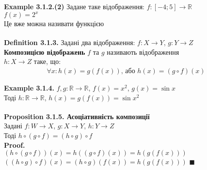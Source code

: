 \documentclass[a4paper, 14pt]{extarticle}
\def\qed{$\blacksquare$}
\begin{document}
	\textbf{Example 3.1.2.(2)} Задане таке відображення: $f: [-4; 5] \to \mathbb{R}$\\
	$f(x) = 2^x$\\
	Це вже можна називати функцією
	\\
	\\
	\textbf{Definition 3.1.3.} Задані два відображення: $f: X \to Y$, $g: Y \to Z$\\
	\textbf{Композицією відображень} $f$ та $g$ називають відображення \\ $h: X \to Z$ таке, що:
	\begin{align*}
	\forall x: h(x) = g(f(x)) \textrm{, або } h(x) = (g \circ f) (x)
	\end{align*}
	\begin{figure}[H]
\end{figure}
	\textbf{Example 3.1.4.} $f,g: \mathbb{R} \to \mathbb{R}$, $f(x) = x^2$, $g(x) = \sin x$\\
	Тоді $h: \mathbb{R} \to \mathbb{R}$, $h(x) = g(f(x)) = \sin x^2$\\
	\\
	\textbf{Proposition 3.1.5. Асоціативність композиції}\\
	Задані $f: W \to X$, $g: X \to Y$, $h: Y \to Z$\\
	Тоді $h \circ (g \circ f) = (h \circ g) \circ f$\\
	\textbf{Proof.}\\
	$(h \circ (g \circ f)) (x) = h((g \circ f) (x)) = h(g(f(x)))$\\
	$((h \circ g) \circ f) (x) = (h \circ g) (f(x)) = h(g(f(x)))$ \qed
\end{document}
